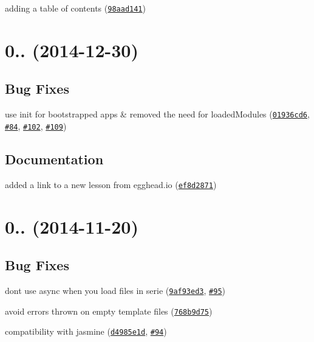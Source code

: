 \begin{DoxyItemize}
\item adding a table of contents (\href{https://github.com/ocombe/ocLazyLoad/commit/98aad14141e2eae1d04f9fc1fe09d85cd4b14713}{\tt 98aad141})
\end{DoxyItemize}

\label{_0.5.2}%
 \section*{0.. (2014-\/12-\/30)}

\subsection*{Bug Fixes}


\begin{DoxyItemize}
\item use init for bootstrapped apps \& removed the need for loaded\+Modules (\href{https://github.com/ocombe/ocLazyLoad/commit/01936cd6fe0e0f89a203408ee0bbb927f5b44d07}{\tt 01936cd6}, \href{https://github.com/ocombe/ocLazyLoad/issues/84}{\tt \#84}, \href{https://github.com/ocombe/ocLazyLoad/issues/102}{\tt \#102}, \href{https://github.com/ocombe/ocLazyLoad/issues/109}{\tt \#109})
\end{DoxyItemize}

\subsection*{Documentation}


\begin{DoxyItemize}
\item added a link to a new lesson from egghead.\+io (\href{https://github.com/ocombe/ocLazyLoad/commit/ef8d2871a445b29588f779a27cb3b702d0da6a13}{\tt ef8d2871})
\end{DoxyItemize}

\label{_0.5.1}%
 \section*{0.. (2014-\/11-\/20)}

\subsection*{Bug Fixes}


\begin{DoxyItemize}
\item don\textquotesingle{}t use async when you load files in serie (\href{https://github.com/ocombe/ocLazyLoad/commit/9af93ed30cf05c6c64594d206dc9bf36a318f46e}{\tt 9af93ed3}, \href{https://github.com/ocombe/ocLazyLoad/issues/95}{\tt \#95})
\item avoid errors thrown on empty template files (\href{https://github.com/ocombe/ocLazyLoad/commit/768b9d751a613a0a10cb476d5c3eac5fdf44f627}{\tt 768b9d75})
\item compatibility with jasmine (\href{https://github.com/ocombe/ocLazyLoad/commit/d4985e1d7ce98315ca64a72730d8c10524929d58}{\tt d4985e1d}, \href{https://github.com/ocombe/ocLazyLoad/issues/94}{\tt \#94})
\end{DoxyItemize}

